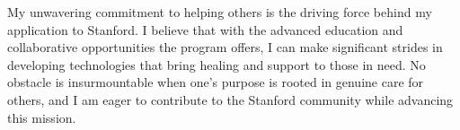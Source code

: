 \documentclass{article}
\newcommand{\graphite}{GRAPHITE\xspace}
\newcommand{\wave}{WAVE\xspace}
\begin{document}
My unwavering commitment to helping others is the driving force behind my application to Stanford. I believe that with the advanced education and collaborative opportunities the program offers, I can make significant strides in developing technologies that bring healing and support to those in need. No obstacle is insurmountable when one's purpose is rooted in genuine care for others, and I am eager to contribute to the Stanford community while advancing this mission.


\end{document}
